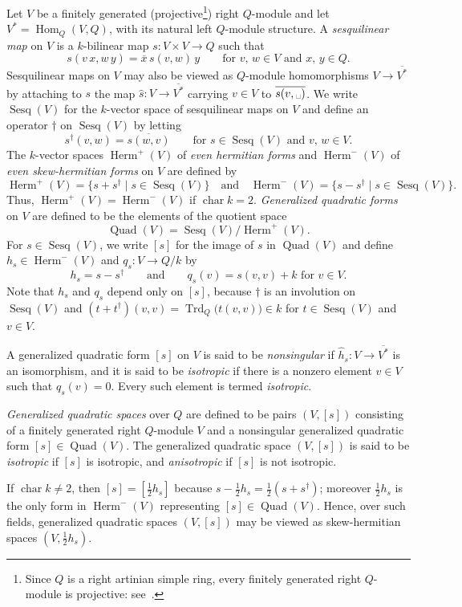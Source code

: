 \documentclass{amsart}
\newcommand{\op}{\dag}
\DeclareMathOperator{\Sesq}{Sesq}
\DeclareMathOperator{\Quad}{Quad}
\DeclareMathOperator{\Herm}{Herm}
\DeclareMathOperator{\charac}{char}
\DeclareMathOperator{\Hom}{Hom}
\DeclareMathOperator{\Trd}{Trd}
\theoremstyle{remark}
\begin{document}
Let $V$ be a finitely generated (projective\footnote{Since $Q$ is a
  right artinian simple ring, every finitely generated right
  $Q$-module is projective: see~\cite[(2.8)]{Lam}.}) right $Q$-module
and let 
$V^*=\Hom_Q(V,Q)$, with its natural left $Q$-module structure.
A \emph{sesquilinear map} on $V$ is a $k$-bilinear map $s\colon
V\times V\to Q$ such that
\[
  s(v\,x, w\,y) = \overline x\, s(v,w)\,y
  \qquad\text{for $v$, $w\in V$ and $x$, $y\in Q$.}
\]
Sesquilinear maps on $V$ may also be viewed as $Q$-module
homomorphisms $V\to \overline{V^*}$ by attaching to $s$ the map
$\widehat s\colon V\to \overline{V^*}$ carrying $v\in V$ to
$\overline{s(v,\mbox{\textvisiblespace})}$. 
We write $\Sesq(V)$ for the $k$-vector space of sesquilinear maps on
$V$ and define an operator $\op$ on $\Sesq(V)$ by letting
\[
  s^\op(v,w) = \overline{s(w,v)}\qquad \text{for $s\in\Sesq(V)$ and
    $v$, $w\in V$}. 
\]
The $k$-vector spaces $\Herm^+(V)$ of \emph{even hermitian forms} and
$\Herm^-(V)$ of \emph{even skew-hermitian forms} on $V$ are defined by
\[
  \Herm^+(V)=\{s+s^\op\mid s\in\Sesq(V)\} \quad\text{and}\quad
  \Herm^-(V)=\{s-s^\op\mid s\in\Sesq(V)\}.
\]
Thus, $\Herm^+(V)=\Herm^-(V)$ if $\charac k=2$. \emph{Generalized
  quadratic forms} on $V$ are defined to be the elements of the
quotient space
\[
  \Quad(V)=\Sesq(V)/\Herm^+(V).
\]
For $s\in\Sesq(V)$, we write $[s]$ for the image of $s$ in $\Quad(V)$
and define $h_s\in\Herm^-(V)$ and $q_s\colon V\to Q/k$ by
\[
  h_s=s-s^\op \qquad\text{and}\qquad
  q_s(v) = s(v,v)+k \text{ for $v\in V$.}
\]
Note that $h_s$ and $q_s$ depend only on $[s]$, because $\op$ is an
involution on $\Sesq(V)$ and $(t+t^\op)(v,v) =
\Trd_Q\bigl(t(v,v)\bigr)\in 
k$ for $t\in\Sesq(V)$ and $v\in V$.

A generalized quadratic form $[s]$ on $V$ is said to be
\emph{nonsingular} if $\widehat h_s\colon V\to \overline{V^*}$ is an
isomorphism, 
and it is said to be \emph{isotropic} if there is a nonzero element
$v\in V$ such that $q_s(v)=0$. Every such element is termed
\emph{isotropic}.
\medbreak

\emph{Generalized quadratic spaces} over $Q$ are defined to be pairs
$(V,[s])$ 
consisting of a finitely generated right $Q$-module $V$ and a
nonsingular generalized quadratic form $[s]\in\Quad(V)$. The
generalized quadratic space $(V,[s])$ is said to be \emph{isotropic}
if $[s]$ is 
isotropic, and \emph{anisotropic} if $[s]$ is not isotropic.

If $\charac k\neq2$, then $[s]=[\frac12h_s]$ because
$s-\frac12h_s=\frac12(s+s^\op)$; moreover $\frac12h_s$ is the only form in
$\Herm^-(V)$ representing $[s]\in\Quad(V)$. Hence, over such fields, generalized
quadratic spaces 
$(V,[s])$ may be viewed as skew-hermitian spaces $(V,\frac12h_s)$.
\end{document}
